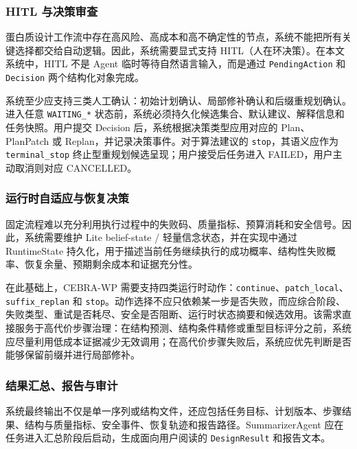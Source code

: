 \subsubsection{HITL
与决策审查}\label{hitl-ux4e0eux51b3ux7b56ux5ba1ux67e5}

蛋白质设计工作流中存在高风险、高成本和高不确定性的节点，系统不能把所有关键选择都交给自动逻辑。因此，系统需要显式支持
HITL（人在环决策）。在本文系统中，HITL 不是 Agent
临时等待自然语言输入，而是通过 \texttt{PendingAction} 和
\texttt{Decision} 两个结构化对象完成。

系统至少应支持三类人工确认：初始计划确认、局部修补确认和后缀重规划确认。进入任意
\texttt{WAITING\_*}
状态前，系统必须持久化候选集合、默认建议、解释信息和任务快照。用户提交
Decision 后，系统根据决策类型应用对应的 Plan、PlanPatch 或
Replan，并记录决策事件。对于算法建议的 \texttt{stop}，其语义应作为
\texttt{terminal\_stop} 终止型重规划候选呈现；用户接受后任务进入
FAILED，用户主动取消则对应 CANCELLED。

\subsubsection{运行时自适应与恢复决策}\label{ux8fd0ux884cux65f6ux81eaux9002ux5e94ux4e0eux6062ux590dux51b3ux7b56}

固定流程难以充分利用执行过程中的失败码、质量指标、预算消耗和安全信号。因此，系统需要维护
Lite belief-state / 轻量信念状态，并在实现中通过 RuntimeState
持久化，用于描述当前任务继续执行的成功概率、结构性失败概率、恢复余量、预期剩余成本和证据充分性。

在此基础上，CEBRA-WP
需要支持四类运行时动作：\texttt{continue}、\texttt{patch\_local}、\texttt{suffix\_replan}
和
\texttt{stop}。动作选择不应只依赖某一步是否失败，而应综合阶段、失败类型、重试是否耗尽、安全是否阻断、运行时状态摘要和候选效用。该需求直接服务于高代价步骤治理：在结构预测、结构条件精修或重型目标评分之前，系统应尽量利用低成本证据减少无效调用；在高代价步骤失败后，系统应优先判断是否能够保留前缀并进行局部修补。

\subsubsection{结果汇总、报告与审计}\label{ux7ed3ux679cux6c47ux603bux62a5ux544aux4e0eux5ba1ux8ba1}

系统最终输出不仅是单一序列或结构文件，还应包括任务目标、计划版本、步骤结果、结构与质量指标、安全事件、恢复轨迹和报告路径。SummarizerAgent
应在任务进入汇总阶段后启动，生成面向用户阅读的 \texttt{DesignResult}
和报告文本。

